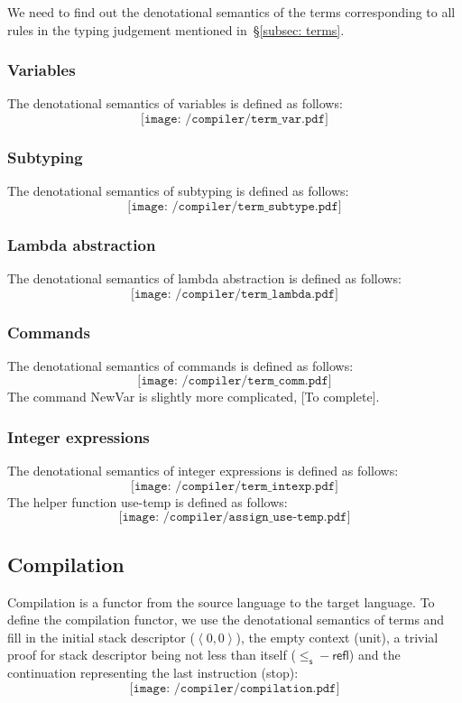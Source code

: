 \documentclass[12pt,a4paper]{report}
\theoremstyle{definition}
\newcommand{\secref}[1]{\S\ref{#1}}
\newcommand{\ang}[1]{\left\langle #1 \right\rangle}
\begin{document}
    We need to find out the denotational semantics of the terms corresponding to all rules in the typing judgement mentioned in~\secref{subsec: terms}. 

        \subsubsection{Variables}
        The denotational semantics of variables is defined as follows:
        \[\texttt{[image: /compiler/term\_var.pdf]}\]

        \subsubsection{Subtyping}
        The denotational semantics of subtyping is defined as follows:
        \[\texttt{[image: /compiler/term\_subtype.pdf]}\]

        \subsubsection{Lambda abstraction}
        The denotational semantics of lambda abstraction is defined as follows:
        \[\texttt{[image: /compiler/term\_lambda.pdf]}\]

        \subsubsection{Commands}
        The denotational semantics of commands is defined as follows:
        \[\texttt{[image: /compiler/term\_comm.pdf]}\]
        The command \textsf{NewVar} is slightly more complicated, [To complete].

        \subsubsection{Integer expressions}
        The denotational semantics of integer expressions is defined as follows:
        \[\texttt{[image: /compiler/term\_intexp.pdf]}\]
        The helper function \textsf{use-temp} is defined as follows:
        \[\texttt{[image: /compiler/assign\_use-temp.pdf]}\]

    \subsection{Compilation} \label{subsec: compilation}
    Compilation is a functor from the source language to the target language. To define the compilation functor, we use the denotational semantics of terms and fill in the initial stack descriptor ($\ang{0, 0}$), the empty context (\textsf{unit}), a trivial proof for stack descriptor being not less than itself ($\mathsf{\leq_s-refl}$) and the continuation representing the last instruction (\textsf{stop}):
    \[\texttt{[image: /compiler/compilation.pdf]}\]
\end{document}
